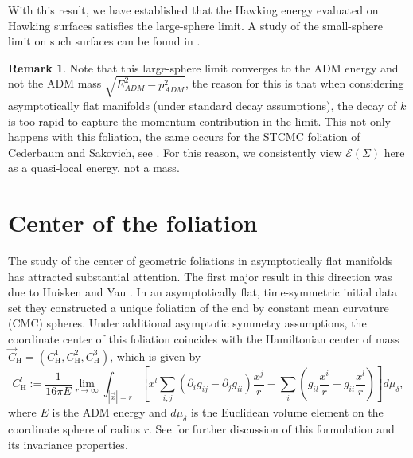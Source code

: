 \documentclass[12pt,a4paper]{amsart}
\theoremstyle{plain}
\theoremstyle{definition}
\newtheorem{remark}[theorem]{Remark}
\begin{document}
With this result, we have established that the Hawking energy evaluated on Hawking surfaces satisfies the large-sphere limit. A study of the small-sphere limit on such surfaces can be found in \cite{Alex, diaz2023local}. 
\begin{remark}
    Note that this large-sphere limit converges to the ADM energy and not the ADM mass $\sqrt{E_{ADM}^2- p_{ADM}^2}$, the reason for this is that when considering asymptotically flat manifolds (under standard decay assumptions), the decay of $k$ is too rapid to capture the momentum contribution in the limit. This not only happens with this foliation, the same occurs for the STCMC foliation of Cederbaum and Sakovich, see \cite[Proposition 5.6]{STCMC}. For this reason, we consistently view $\mathcal{E}(\Sigma)$  here as a quasi‐local energy, not a mass.
\end{remark}
\section{Center of the foliation}\label{sectioncenter}





The study of the center of geometric foliations in asymptotically flat manifolds has attracted substantial attention. The first major result in this direction was due to Huisken and Yau \cite{HY}. In an asymptotically flat, time-symmetric initial data set they constructed a unique foliation of the end by constant mean curvature (CMC) spheres. Under additional asymptotic symmetry assumptions,  the coordinate center of this foliation coincides with the Hamiltonian center of mass \(\vec{C}_{\mathrm{H}} = (C^1_{\mathrm{H}}, C^2_{\mathrm{H}}, C^3_{\mathrm{H}})\), which is given by
\begin{equation}\label{eq:BOM_center}
    C^l_{\text{H}} :=
    \frac{1}{16\pi E} \lim_{r \to \infty} \int_{|\vec{x}|=r}
    \left[
    x^l \sum_{i,j} \left( \partial_i g_{ij} - \partial_j g_{ii} \right) \frac{x^j}{r}
    - \sum_i
    \left(
    g_{il} \frac{x^i}{r} - g_{ii} \frac{x^l}{r}
    \right)
    \right]
    d\mu_\delta,   
\end{equation}
where \(E\) is the ADM energy and \(d\mu_\delta\) is the Euclidean volume element on the coordinate sphere of radius \(r\). See \cite{beigmurch, regge1974role} for further discussion of this formulation and its invariance properties.
\end{document}
